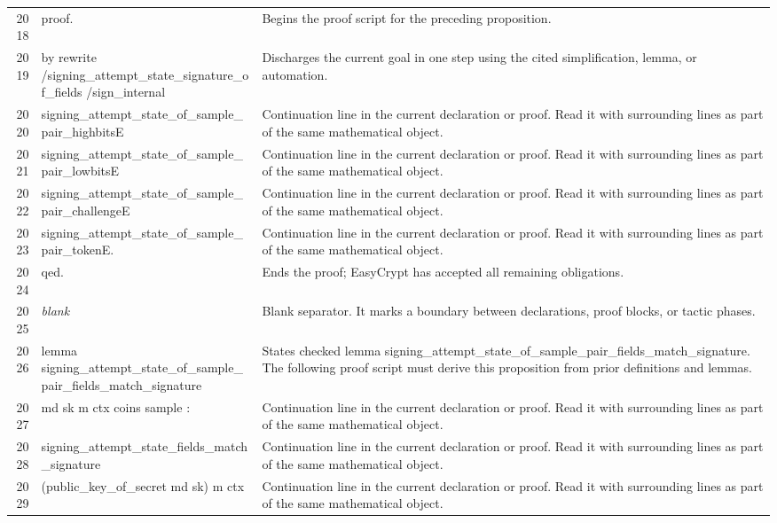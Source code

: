 \documentclass[10pt]{article}
\begin{document}
\begin{longtable}{r L{0.53\textwidth} L{0.37\textwidth}}
2018 & {\ttfamily\scriptsize proof.} & Begins the proof script for the preceding proposition. \\
2019 & {\ttfamily\scriptsize by rewrite /signing\_attempt\_state\_signature\_of\_fields /sign\_internal} & Discharges the current goal in one step using the cited simplification, lemma, or automation. \\
2020 & {\ttfamily\scriptsize            signing\_attempt\_state\_of\_sample\_pair\_highbitsE} & Continuation line in the current declaration or proof.  Read it with surrounding lines as part of the same mathematical object. \\
2021 & {\ttfamily\scriptsize            signing\_attempt\_state\_of\_sample\_pair\_lowbitsE} & Continuation line in the current declaration or proof.  Read it with surrounding lines as part of the same mathematical object. \\
2022 & {\ttfamily\scriptsize            signing\_attempt\_state\_of\_sample\_pair\_challengeE} & Continuation line in the current declaration or proof.  Read it with surrounding lines as part of the same mathematical object. \\
2023 & {\ttfamily\scriptsize            signing\_attempt\_state\_of\_sample\_pair\_tokenE.} & Continuation line in the current declaration or proof.  Read it with surrounding lines as part of the same mathematical object. \\
2024 & {\ttfamily\scriptsize qed.} & Ends the proof; EasyCrypt has accepted all remaining obligations. \\
2025 & {\ttfamily\scriptsize \emph{blank}} & Blank separator.  It marks a boundary between declarations, proof blocks, or tactic phases. \\
2026 & {\ttfamily\scriptsize lemma signing\_attempt\_state\_of\_sample\_pair\_fields\_match\_signature} & States checked lemma signing\_attempt\_state\_of\_sample\_pair\_fields\_match\_signature.  The following proof script must derive this proposition from prior definitions and lemmas. \\
2027 & {\ttfamily\scriptsize    md sk m ctx coins sample :} & Continuation line in the current declaration or proof.  Read it with surrounding lines as part of the same mathematical object. \\
2028 & {\ttfamily\scriptsize   signing\_attempt\_state\_fields\_match\_signature} & Continuation line in the current declaration or proof.  Read it with surrounding lines as part of the same mathematical object. \\
2029 & {\ttfamily\scriptsize     (public\_key\_of\_secret md sk) m ctx} & Continuation line in the current declaration or proof.  Read it with surrounding lines as part of the same mathematical object. \\

\end{longtable}
\end{document}

